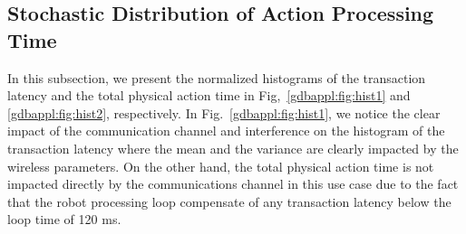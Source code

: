 \subsection{Stochastic Distribution of Action Processing Time}
In this subsection, we present the normalized histograms of the transaction latency and the total physical action time in Fig,~\ref{gdbappl:fig:hist1} and \ref{gdbappl:fig:hist2}, respectively. In Fig.~\ref{gdbappl:fig:hist1}, we notice the clear impact of the communication channel and interference on the histogram of the transaction latency where the mean and the variance are clearly impacted by the wireless parameters. On the other hand, the total physical action time is not impacted directly by the communications channel in this use case due to the fact that the robot processing loop compensate of any transaction latency below the loop time of 120 ms. 

